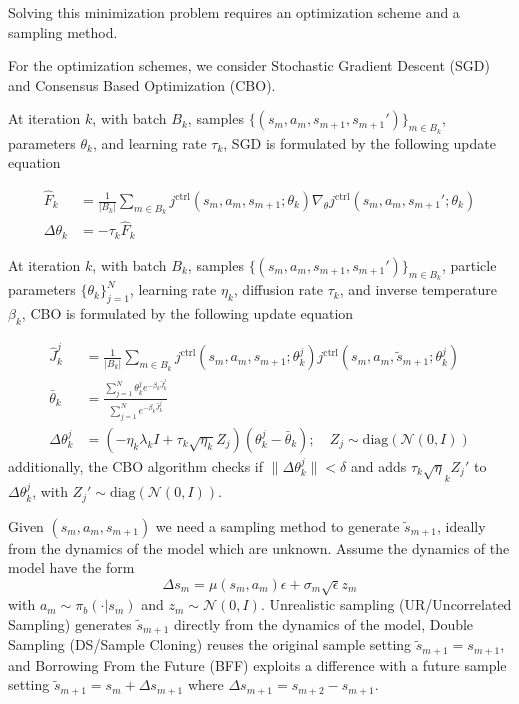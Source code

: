 \documentclass[10.5pt]{article}
\newcommand\cc{\mathcal}
\begin{document}
Solving this minimization problem requires an optimization scheme and a sampling method.

For the optimization schemes, we consider Stochastic Gradient Descent (SGD) and Consensus Based Optimization (CBO).

At iteration $k$, with batch $B_k$, samples $\{(s_m, a_m, s_{m+1},s_{m+1}')\}_{m\in B_k}$, parameters $\theta_k$, and learning rate $\tau_k$, SGD is formulated by the following update equation

\begin{align*}
  \hat F_k &= \frac{1}{|B_k|}\sum_{m\in B_k} j^{\text{ctrl}}(s_m, a_m, s_{m+1};\theta_k )\nabla_\theta j^{\text{ctrl}}(s_m, a_m, s_{m+1}';\theta_k)\\
  \Delta\theta_k &= -\tau_k \hat F_k 
\end{align*}

At iteration $k$, with batch $B_k$, samples $\{(s_m, a_m, s_{m+1},s_{m+1}')\}_{m\in B_k}$, particle parameters $\{\theta_k\}_{j=1}^N$, learning rate $\eta_k$, diffusion rate $\tau_k$, and inverse temperature $\beta_k$, CBO is formulated by the following update equation

\begin{align*}
  \hat J_k^j &= \frac{1}{|B_k|}\sum_{m\in B_k} j^{\text{ctrl}}(s_m, a_m, s_{m+1};\theta_{k}^j) j^{\text{ctrl}}(s_m, a_m, \tilde s_{m+1};\theta_{k}^j)\\
  \bar\theta_k &= \frac{\sum_{j=1}^N \theta^{j}_{k} e^{-\beta_k \hat J^j_k}}{\sum_{j=1}^N  e^{-\beta_k\hat J_k^j}}\\
  \Delta \theta^{j}_k &= (-\eta_k \lambda_k I+\tau_k\sqrt{\eta_k} Z_j)(\theta^j_{k}-\bar\theta_k); \quad Z_j\sim \text{diag}(\mathcal N(0,I))
\end{align*}
additionally, the CBO algorithm checks if $\|\Delta \theta^j_k\|<\delta$ and adds $\tau_k \sqrt \eta_k Z_j'$ to $\Delta \theta_k^j$, with $Z_j'\sim\text{diag}(\mathcal N(0,I))$.

Given $(s_m,a_m,s_{m+1})$ we need a sampling method to generate $\tilde s_{m+1}$, ideally from the dynamics of the model which are unknown. Assume the dynamics of the model have the form
$$\Delta s_m = \mu(s_m, a_m) \epsilon + \sigma_m \sqrt \epsilon z_m$$ with $a_m\sim \pi_b(\cdot|s_m)$ and $z_m\sim \cc N(0,I)$. Unrealistic sampling (UR/Uncorrelated Sampling) generates $\tilde s_{m+1}$ directly from the dynamics of the model, Double Sampling (DS/Sample Cloning) reuses the original sample setting $\tilde s_{m+1}=s_{m+1}$, and Borrowing From the Future (BFF) exploits a difference with a future sample setting $\tilde s_{m+1}=s_m+\Delta s_{m+1}$ where $\Delta s_{m+1}=s_{m+2}-s_{m+1}$.
\end{document}
